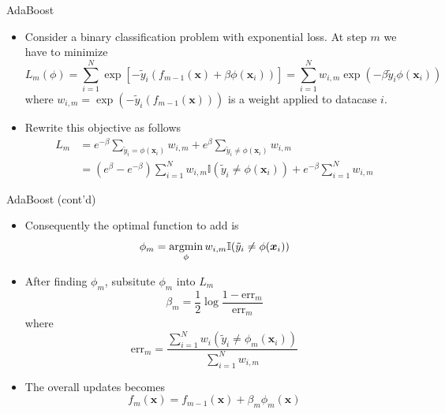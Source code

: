 \documentclass[10pt,mathserif]{beamer}
\begin{document}
\begin{frame}{AdaBoost}
\begin{itemize}
    \item Consider a binary classification problem with exponential loss. At step $m$ we have to minimize
    \begin{equation*}
        L_m(\phi) = \sum_{i=1}^N \exp[-\tilde{y}_i(f_{m-1}(\bm{x}) + \beta\phi(\bm{x}_i))] = \sum_{i=1}^N w_{i,m}\exp(-\beta\tilde{y}_i\phi(\bm{x}_i))
    \end{equation*}
     where $w_{i,m} = \exp(-\tilde{y}_i(f_{m-1}(\bm{x})))$ is a weight applied to datacase $i$.
    \item Rewrite this objective as follows
    \begin{equation*}
        \begin{split}
            L_m & = e^{-\beta} \sum_{\tilde{y}_i = \phi(\bm{x}_i)} w_{i,m} + e^\beta \sum_{\tilde{y}_i \neq \phi(\bm{x}_i)} w_{i,m} \\
            & = (e^{\beta} - e^{-\beta} )\sum_{i=1}^N w_{i,m} \mathbb{I}(\tilde{y}_i \neq \phi(\bm{x}_i)) + e^{-\beta}\sum_{i=1}^N w_{i,m}
        \end{split}
    \end{equation*}
\end{itemize}
\end{frame}

\begin{frame}{AdaBoost (cont'd)}
\begin{itemize}
    \item Consequently the optimal function to add is
    \begin{equation*}
        \phi_m  = \mathop{\rm argmin}_{\phi} w_{i,m} \mathbb{I}(\tilde{y}_i \neq \phi(\bm{x}_i))
    \end{equation*}
    \item After finding $\phi_m$, subsitute $\phi_m$ into $L_m$
    \begin{equation*}
        \beta_m = \frac{1}{2}\log\frac{1-\text{err}_m}{\text{err}_m}
    \end{equation*}
    where 
    \begin{equation*}
        \text{err}_m = \frac{\sum_{i=1}^N w_i \mathbb{}(\tilde{y}_i \neq \phi_m(\bm{x}_i))}{\sum_{i=1}^N w_{i,m}}
    \end{equation*}
    \item The overall updates becomes 
    \begin{equation*}
        f_m(\bm{x})= f_{m-1}(\bm{x}) + \beta_m\phi_m(\bm{x})
    \end{equation*}
\end{itemize}
\end{frame}
\end{document}
